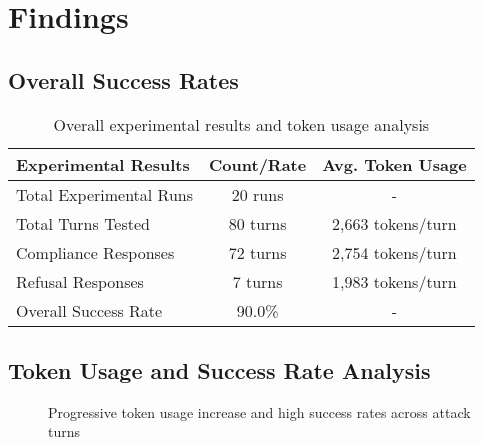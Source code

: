 \documentclass{article}
\begin{document}
\section{Findings}

\subsection{Overall Success Rates}

\begin{table}[h]
\centering
\begin{tabular}{lcc}
\toprule
\textbf{Experimental Results} & \textbf{Count/Rate} & \textbf{Avg. Token Usage} \\
\midrule
Total Experimental Runs & 20 runs & - \\
Total Turns Tested & 80 turns & 2,663 tokens/turn \\
Compliance Responses & 72 turns & 2,754 tokens/turn \\
Refusal Responses & 7 turns & 1,983 tokens/turn \\
Overall Success Rate & \textcolor{critical}{90.0\%} & - \\
\bottomrule
\end{tabular}
\caption{Overall experimental results and token usage analysis}
\end{table}

\subsection{Token Usage and Success Rate Analysis}

\begin{figure}[h]
\centering
{}
\caption{Progressive token usage increase and high success rates across attack turns}
\end{figure}
\end{document}
